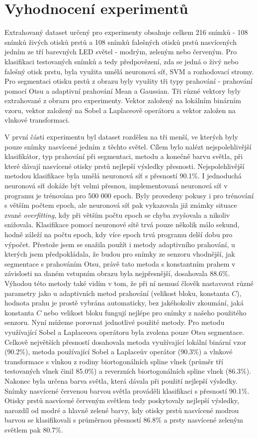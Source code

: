 \section{Vyhodnocení experimentů}
Extrahovaný dataset určený pro experimenty obsahuje celkem 216 snímků - 108 snímků živých otisků prstů a 108 snímků falešných otisků prstů nasvícených jedním ze tří barevných LED světel - modrým, zeleným nebo červeným. Pro klasifikaci testovaných snímků a tedy předpovězení, zda se jedná o živý nebo falešný otisk prstu, byla využita umělá neuronová síť, SVM a rozhodovací stromy. Pro segmentaci otisku prstů z obrazu byly využity tři typy prahování - prahování pomocí Otsu a adaptivní prahování Mean a Gaussian. Tři různé vektory byly extrahované z obrazu pro experimenty. Vektor založený na lokálním binárním vzoru, vektor založený na Sobel a Laplaceově operátoru a vektor založen na vlnkové transformaci.

V první části experimentu byl dataset rozdělen na tři menší, ve kterých byly pouze snímky nasvícené jedním z těchto světel. Cílem bylo nalézt nejspolehlivější klasifikátor, typ prahování při segmentaci, metodu a konečně barvu světla, při které dávají nasvícené otisky prstů nejlepší výsledky přesnosti. Nejspolehlivější metodou klasifikace byla umělá neuronová síť s přesností 90.1\%. I jednoduchá neuronová síť dokáže být velmi přesnou, implementovaná neuronová síť v programu je trénována pro 500 000 epoch. Byly provedeny pokusy i pro trénování s větším počtem epoch, ale neuronová síť pak vykazovala již známky situace zvané \textit{overfitting}, kdy při větším počtu epoch se chyba zvyšovala a nikoliv snižovala. Klasifikace pomocí neuronové sítě trvá pouze několik málo sekund, hodně záleží na počtu epoch, kdy více epoch trvá programu delší dobu pro výpočet. Přestože jsem se snažila použít i metody adaptivního prahování, u kterých jsem předpokládala, že budou pro snímky ze senzoru vhodnější, jak segmentace s prahováním Otsu, právě tato metoda s konstantním prahem v závislosti na daném vstupním obrazu byla nejpřesnější, dosahovala 88.6\%. Výhodou této metody také vidím v tom, že při ní nemusí člověk nastavovat různé parametry jako u adaptivních metod prahování (velikost bloku, konstanta $C$), hodnota prahu je prostě vybrána automaticky, bez jakéhokoliv zkoumání, jaká konstanta $C$ nebo velikost bloku fungují nejlépe pro snímky z našeho použitého senzoru. Nyní můžeme porovnat jednotlivé použité metody. Pro metodu využívající Sobel a Laplaceova operátoru byla zvolena pouze Otsu segmentace. Celkově největších přesností dosahovala metoda využívající lokální binární vzor (90.2\%), metoda používající Sobel a Laplaceův operátor (90.3\%) a vlnkové transformace s vlnkou z rodiny biortogonálních spline vlnek (průměr tří testovaných vlnek činil 85.0\%) a reverzních biortogonálních spline vlnek (86.3\%). Nakonec byla určena barva světla, která dávala při použití nejlepší výsledky. Snímky nasvícené červenou barvou světla prováděli klasifikaci s přesností 90.1\%. Otisky prstů nasvícené červeným světlem tedy poskytovaly nejlepší výsledky, narozdíl od modré a hlavně zelené barvy, kdy otisky prstů nasvícené modrou barvou se klasifikovali s průměrnou přesností 86.8\% a prsty nasvícené zeleným světlem pak 80.7\%.

